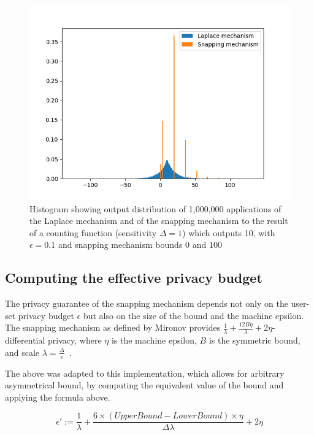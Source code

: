 \documentclass[orivec,envcountsame]{llncs}
\begin{document}
\begin{figure}[H]
\begin{center}
\includegraphics[scale=0.65]{tex/graphics/LaplacevsSnapping.png}
\caption{Histogram showing output distribution of 1,000,000 applications of the Laplace mechanism and of the snapping mechanism to the result of a counting function (sensitivity $\Delta=1$) which outputs 10, with $\epsilon = 0.1$ and snapping mechanism bounds $0$ and $100$ }
\label{fig:laplacevssnapping}
\end{center}
\end{figure}

\subsection{Computing the effective privacy budget}

The privacy guarantee of the snapping mechanism depends not only on the user-set privacy budget $\epsilon$ but also on the size of the bound and the machine epsilon. The snapping mechanism as defined by Mironov provides $\frac{1}{\lambda} + \frac{12 B \eta}{\lambda} + 2 \eta$-differential privacy, where $\eta$ is the machine epsilon, $B$ is the symmetric bound, and scale $\lambda = \frac{\Delta}{\epsilon}$~\cite{mironov2012significance}. 

The above was adapted to this implementation, which allows for arbitrary asymmetrical bound, by computing the equivalent value of the bound and applying the formula above.

$$\epsilon' := \frac{1}{\lambda} + \frac{6\times(UpperBound - LowerBound)\times\eta}{\Delta\lambda} + 2\eta$$
\end{document}
